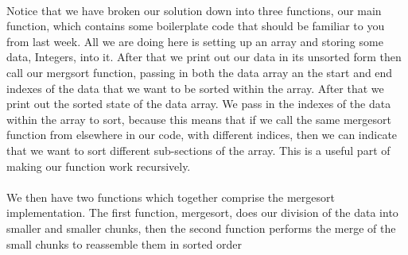 \documentclass[10pt, a4paper, twosize]{article}
\begin{document}
\paragraph{} Notice that we have broken our solution down into three functions, our main function, which contains some boilerplate code that should be familiar to you from last week. All we are doing here is setting up an array and storing some data, Integers, into it. After that we print out our data in its unsorted form then call our mergsort function, passing in both the data array an the start and end indexes of the data that we want to be sorted within the array. After that we print out the sorted state of the data array. We pass in the indexes of the data within the array to sort, because this means that if we call the same mergesort function from elsewhere in our code, with different indices, then we can indicate that we want to sort different sub-sections of the array. This is a useful part of making our function work recursively.

\paragraph{} We then have two functions which together comprise the mergesort implementation. The first function, mergesort, does our division of the data into smaller and smaller chunks, then the second function performs the merge of the small chunks to reassemble them in sorted order


\end{document}
